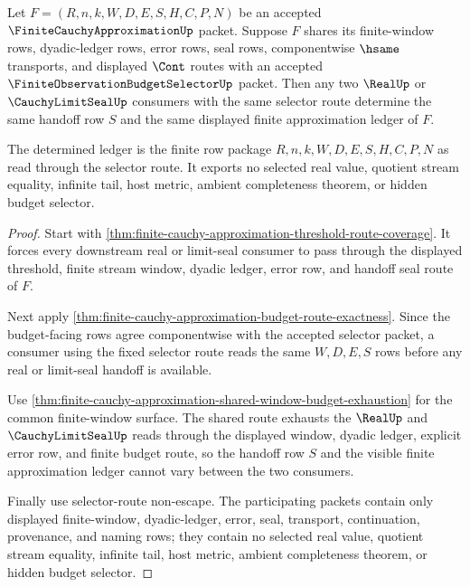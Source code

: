 \begin{theorem}
\label{thm:finite-cauchy-approximation-selector-budget-determinacy}
Let $F=(R,n,k,W,D,E,S,H,C,P,N)$ be an accepted $\FiniteCauchyApproximationUp$ packet. Suppose $F$ shares its finite-window rows, dyadic-ledger rows, error rows, seal rows, componentwise $\hsame$ transports, and displayed $\Cont$ routes with an accepted $\FiniteObservationBudgetSelectorUp$ packet. Then any two $\RealUp$ or $\CauchyLimitSealUp$ consumers with the same selector route determine the same handoff row $S$ and the same displayed finite approximation ledger of $F$.

The determined ledger is the finite row package $R,n,k,W,D,E,S,H,C,P,N$ as read through the selector route. It exports no selected real value, quotient stream equality, infinite tail, host metric, ambient completeness theorem, or hidden budget selector.
\end{theorem}
\begin{proof}
Start with \autoref{thm:finite-cauchy-approximation-threshold-route-coverage}. It forces every downstream real or limit-seal consumer to pass through the displayed threshold, finite stream window, dyadic ledger, error row, and handoff seal route of $F$.

Next apply \autoref{thm:finite-cauchy-approximation-budget-route-exactness}. Since the budget-facing rows agree componentwise with the accepted selector packet, a consumer using the fixed selector route reads the same $W,D,E,S$ rows before any real or limit-seal handoff is available.

Use \autoref{thm:finite-cauchy-approximation-shared-window-budget-exhaustion} for the common finite-window surface. The shared route exhausts the $\RealUp$ and $\CauchyLimitSealUp$ reads through the displayed window, dyadic ledger, explicit error row, and finite budget route, so the handoff row $S$ and the visible finite approximation ledger cannot vary between the two consumers.

Finally use selector-route non-escape. The participating packets contain only displayed finite-window, dyadic-ledger, error, seal, transport, continuation, provenance, and naming rows; they contain no selected real value, quotient stream equality, infinite tail, host metric, ambient completeness theorem, or hidden budget selector.
\end{proof}

